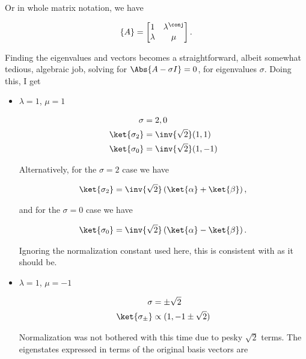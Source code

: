Or in whole matrix notation, we have

\begin{align}\label{eqn:desaiDiracNotes:71}
\{ A \} = 
\begin{bmatrix}
1 & \lambda^\conj \\
\lambda & \mu
\end{bmatrix}.
\end{align}

Finding the eigenvalues and vectors becomes a straightforward, albeit somewhat tedious, algebraic job, solving for $\Abs{ A - \sigma I } = 0$, for eigenvalues $\sigma$.  Doing this, I get

\begin{itemize}
\item $\lambda = 1$, $\mu = 1$

\begin{align}\label{eqn:desaiDiracNotes:72}
\sigma &= 2,0 \\
\ket{\sigma_2} &= \inv{\sqrt{2}} (1,1) \\
\ket{\sigma_0} &= \inv{\sqrt{2}} (1,-1) 
\end{align}

Alternatively, for the $\sigma=2$ case we have

\begin{align}\label{eqn:desaiDiracNotes:72i}
\ket{\sigma_2} = \inv{\sqrt{2}}\left( \ket{\alpha} + \ket{\beta} \right),
\end{align}

and for the $\sigma=0$ case we have

\begin{align}\label{eqn:desaiDiracNotes:72ii}
\ket{\sigma_0} = \inv{\sqrt{2}}\left( \ket{\alpha} - \ket{\beta} \right).
\end{align}

Ignoring the normalization constant used here, this is consistent with  as it should be.

\item $\lambda = 1$, $\mu = -1$

\begin{align}\label{eqn:desaiDiracNotes:73}
\sigma &= \pm \sqrt{2} \\
\ket{\sigma_{\pm}} &\propto (1,-1 \pm \sqrt{2}) 
\end{align}

Normalization was not bothered with this time due to pesky $\sqrt{2}$ terms.  The eigenstates expressed in terms of the original basis vectors are 


\end{itemize}
